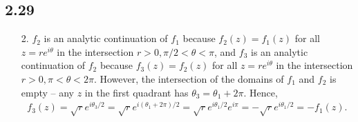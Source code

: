 \documentclass[a4paper,12pt]{article}
\begin{document}
\subsection*{2.29}
\begin{enumerate}
    \item[2.]
        $f_2$ is an analytic continuation of $f_1$ because $f_2(z) = f_1(z)$ for all $z = re^{i \theta}$ in the intersection $r > 0, \pi/2 < \theta < \pi$, and $f_3$ is an analytic continuation of $f_2$ because $f_3(z) = f_2(z)$ for all $z = re^{i \theta}$ in the intersection $r > 0, \pi < \theta < 2\pi$. However, the intersection of the domains of $f_1$ and $f_2$ is empty -- any $z$ in the first quadrant has $\theta_3 = \theta_1 + 2\pi$. Hence,
        \begin{align*}
            f_3(z) = \sqrt{r} e^{i \theta_3 / 2} = \sqrt{r} e^{i (\theta_1 + 2\pi) / 2} = \sqrt{r} e^{i \theta_1 / 2} e^{i \pi} = -\sqrt{r} e^{i \theta_1 / 2} = -f_1(z).
        \end{align*}
\end{enumerate}
\end{document}
